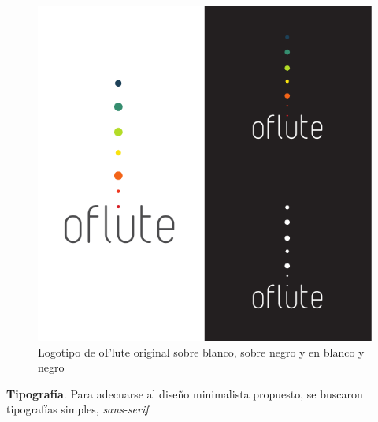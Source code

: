 \begin{figure}[htp!]
  \centering
  \includegraphics[width=\textwidth]{5_diseno/imagen_composite}
  \caption{Logotipo de oFlute original sobre blanco, sobre negro y en blanco y
    negro}
\end{figure}

\textbf{Tipografía}. Para adecuarse al diseño minimalista propuesto, se buscaron
tipografías simples, \textit{sans-serif} 

